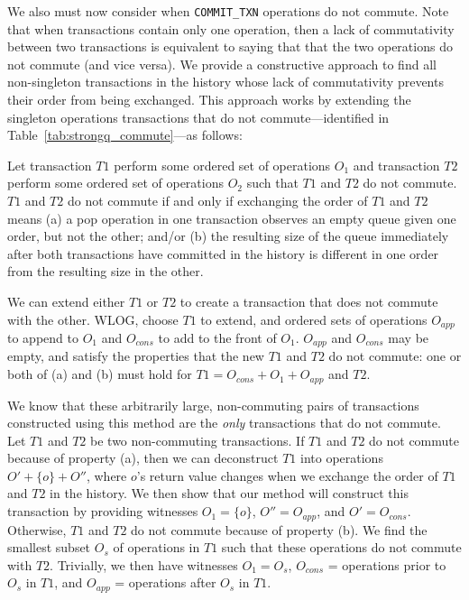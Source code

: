 We also must now consider when \texttt{COMMIT\_TXN} operations do not commute. Note that when transactions contain only one operation, then a lack of commutativity between two transactions is equivalent to saying that that the two operations do not commute (and vice versa). We provide a constructive approach to find all non-singleton transactions in the history whose lack of commutativity prevents their order from being exchanged. This approach works by extending the singleton operations transactions that do not commute---identified in Table~\ref{tab:strongq_commute}---as follows: 

Let transaction $T1$ perform some ordered set of operations $O_1$ and transaction $T2$ perform some ordered set of operations $O_2$ such that $T1$ and $T2$ do not commute. $T1$ and $T2$ do not commute if and only if exchanging the order of $T1$ and $T2$ means (a) a pop operation in one transaction observes an empty queue given one order, but not the other; and/or (b) the resulting size of the queue immediately after both transactions have committed in the history is different in one order from the resulting size in the other.
   
We can extend either $T1$ or $T2$ to create a transaction that does not commute with the other. WLOG, choose $T1$ to extend, and ordered sets of operations $O_{app}$ to append to $O_1$ and $O_{cons}$ to add to the front of $O_1$. $O_{app}$ and $O_{cons}$ may be empty, and satisfy the properties that the new $T1$ and $T2$ do not commute: one or both of (a) and (b) must hold for $T1 = O_{cons} + O_1 + O_{app}$ and $T2$.

We know that these arbitrarily large, non-commuting pairs of transactions constructed using this method are the \emph{only} transactions that do not commute. Let $T1$ and $T2$ be two non-commuting transactions. If $T1$ and $T2$ do not commute because of property (a), then we can deconstruct $T1$ into operations $O' + \{o\} + O''$, where $o$'s return value changes when we exchange the order of $T1$ and $T2$ in the history. We then show that our method will construct this transaction by providing witnesses $O_1 = \{o\}$, $O'' = O_{app}$, and $O' = O_{cons}$.
Otherwise, $T1$ and $T2$ do not commute because of property (b). We find the smallest subset $O_s$ of operations in $T1$ such that these operations do not commute with $T2$. Trivially, we then have witnesses $O_1 = O_s$, $O_{cons}$ = operations prior to $O_s$ in $T1$, and $O_{app}$ = operations after $O_s$ in $T1$.

